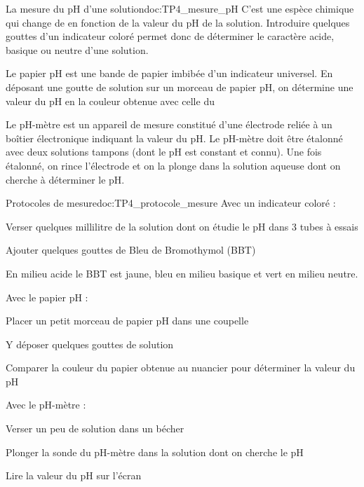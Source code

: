 \begin{doc}{La mesure du pH d'une solution}{doc:TP4_mesure_pH}
  \pointCyan {}
  C’est une espèce chimique qui change de  en fonction de la valeur du pH de la solution.
  Introduire quelques gouttes d’un indicateur coloré permet donc de déterminer le caractère acide, basique ou neutre d’une solution. \\
  \flecheLongue {}

  \pointCyan {}
  Le papier pH est une bande de papier imbibée d’un indicateur universel.
  En déposant une goutte de solution sur un morceau de papier pH, on détermine une valeur  du pH en  la couleur obtenue avec celle du  \\  
  \flecheLongue {}

  \pointCyan {}
  Le pH-mètre est un appareil de mesure constitué d’une électrode reliée à un boîtier électronique indiquant la valeur du pH.
  Le pH-mètre doit être étalonné avec deux solutions tampons (dont le pH est constant et connu).
  Une fois étalonné, on rince l’électrode et on la plonge dans la solution aqueuse dont on cherche à déterminer le pH. \\
  \flecheLongue {}
\end{doc}

\begin{doc}{Protocoles de mesure}{doc:TP4_protocole_mesure}
  Avec un indicateur coloré :
  \begin{protocole}
    \item Verser quelques millilitre de la solution dont on étudie le pH dans 3 tubes à essais
    \item Ajouter quelques gouttes de Bleu de Bromothymol (BBT)
    \item En milieu acide le BBT est jaune, bleu en milieu basique et vert en milieu neutre.
  \end{protocole}
  
  Avec le papier pH :
  \begin{protocole}
    \item Placer un petit morceau de papier pH dans une coupelle
    \item Y déposer quelques gouttes de solution
    \item Comparer la couleur du papier obtenue au nuancier pour déterminer la valeur du pH
  \end{protocole}
  
  Avec le pH-mètre :
  \begin{protocole}
    \item Verser un peu de solution dans un bécher
    \item Plonger la sonde du pH-mètre dans la solution dont on cherche le pH
    \item Lire la valeur du pH sur l’écran
  \end{protocole}
\end{doc}

